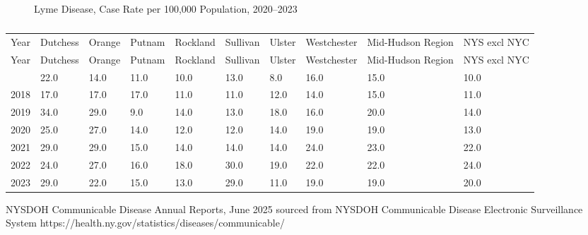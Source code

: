 \documentclass[
  english,
  letterpaper,
]{report}
\begin{document}
\begin{figure}


\caption{\label{fig-lyme-disease}Lyme Disease, Case Rate per 100,000
Population, 2020--2023}

\end{figure}%

\begin{longtable}[]{@{}llllllllll@{}}

\caption{\label{tbl-lyme-disease}Lyme Disease, Case Rate per 100,000
Population, 2020--2023}

\tabularnewline

\caption{}\label{T_358c3}\tabularnewline
\toprule\noalign{}
Year & Dutchess & Orange & Putnam & Rockland & Sullivan & Ulster &
Westchester & Mid-Hudson Region & NYS excl NYC \\
\midrule\noalign{}
\endfirsthead
\toprule\noalign{}
Year & Dutchess & Orange & Putnam & Rockland & Sullivan & Ulster &
Westchester & Mid-Hudson Region & NYS excl NYC \\
\midrule\noalign{}
\endhead
\bottomrule\noalign{}
\endlastfoot
2017 & 22.0 & 14.0 & 11.0 & 10.0 & 13.0 & 8.0 & 16.0 & 15.0 & 10.0 \\
2018 & 17.0 & 17.0 & 17.0 & 11.0 & 11.0 & 12.0 & 14.0 & 15.0 & 11.0 \\
2019 & 34.0 & 29.0 & 9.0 & 14.0 & 13.0 & 18.0 & 16.0 & 20.0 & 14.0 \\
2020 & 25.0 & 27.0 & 14.0 & 12.0 & 12.0 & 14.0 & 19.0 & 19.0 & 13.0 \\
2021 & 29.0 & 29.0 & 15.0 & 14.0 & 14.0 & 14.0 & 24.0 & 23.0 & 22.0 \\
2022 & 24.0 & 27.0 & 16.0 & 18.0 & 30.0 & 19.0 & 22.0 & 22.0 & 24.0 \\
2023 & 29.0 & 22.0 & 15.0 & 13.0 & 29.0 & 11.0 & 19.0 & 19.0 & 20.0 \\

\end{longtable}

\begin{tcolorbox}[enhanced jigsaw, breakable, leftrule=.75mm, title=\textcolor{quarto-callout-note-color}{\faInfo}\hspace{0.5em}{Source}, bottomrule=.15mm, opacityback=0, left=2mm, colback=white, bottomtitle=1mm, coltitle=black, colbacktitle=quarto-callout-note-color!10!white, colframe=quarto-callout-note-color-frame, opacitybacktitle=0.6, toptitle=1mm, titlerule=0mm, arc=.35mm, rightrule=.15mm, toprule=.15mm]

NYSDOH Communicable Disease Annual Reports, June 2025 sourced from
NYSDOH Communicable Disease Electronic Surveillance System
https://health.ny.gov/statistics/diseases/communicable/

\end{tcolorbox}
\end{document}
